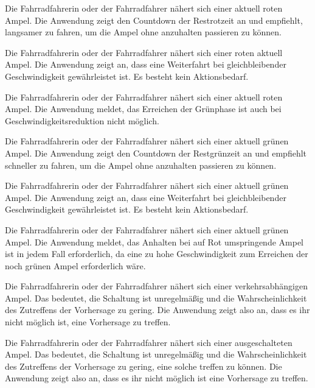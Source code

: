 \begin{description}[leftmargin=0.7cm,style=nextline]
\item[Szenario R1:] 
Die Fahrradfahrerin oder der Fahrradfahrer nähert sich einer aktuell roten Ampel. Die Anwendung zeigt den Countdown der Restrotzeit an und empfiehlt, langsamer zu fahren, um die Ampel ohne anzuhalten passieren zu können.  \\
\item[Szenario R2:] 
Die Fahrradfahrerin oder der Fahrradfahrer nähert sich einer roten aktuell Ampel. Die Anwendung zeigt an, dass eine Weiterfahrt bei gleichbleibender Geschwindigkeit gewährleistet ist. Es besteht kein Aktionsbedarf. \\
\item[Szenario R3:] 
Die Fahrradfahrerin oder der Fahrradfahrer nähert sich einer aktuell roten Ampel. Die Anwendung meldet, das Erreichen der Grünphase ist auch bei Geschwindigkeitsreduktion nicht möglich.\\%
\item[Szenario G1:] 
Die Fahrradfahrerin oder der Fahrradfahrer nähert sich einer aktuell grünen Ampel. Die Anwendung zeigt den Countdown der Restgrünzeit an und empfiehlt schneller zu fahren, um die Ampel ohne anzuhalten passieren zu können.\\
\item[Szenario G2:] 
Die Fahrradfahrerin oder der Fahrradfahrer nähert sich einer aktuell grünen Ampel. Die Anwendung zeigt an, dass eine Weiterfahrt bei gleichbleibender Geschwindigkeit gewährleistet ist. Es besteht kein Aktionsbedarf.\\ 
\item[Szenario G3:] 
Die Fahrradfahrerin oder der Fahrradfahrer nähert sich einer aktuell grünen Ampel. Die Anwendung meldet, das Anhalten bei auf Rot umspringende Ampel ist in jedem Fall erforderlich, da eine zu hohe Geschwindigkeit zum Erreichen der noch grünen Ampel erforderlich wäre.\\
\item[Szenario V1:] 
Die Fahrradfahrerin oder der Fahrradfahrer nähert sich einer verkehrsabhängigen Ampel. Das bedeutet, die Schaltung ist unregelmäßig und die Wahrscheinlichkeit des Zutreffens der Vorhersage zu gering. Die Anwendung zeigt also an, dass es ihr nicht möglich ist, eine Vorhersage zu treffen.\\ 
\item[Szenario V2:] 
Die Fahrradfahrerin oder der Fahrradfahrer nähert sich einer ausgeschalteten Ampel. Das bedeutet, die Schaltung ist unregelmäßig und die Wahrscheinlichkeit des Zutreffens der Vorhersage zu gering, eine solche treffen zu können. Die Anwendung zeigt also an, dass es ihr nicht möglich ist eine Vorhersage zu treffen.\\ 
\end{description} %
